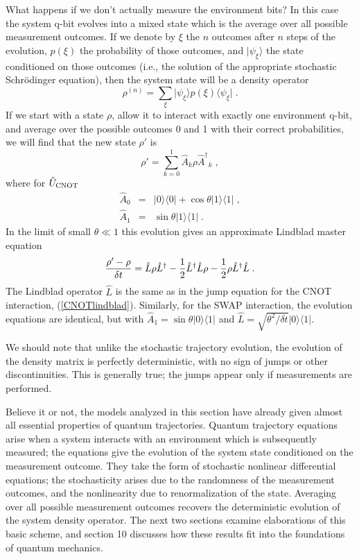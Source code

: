 \documentclass[12pt]{article}
\def\bra#1{{\langle #1 |}}
\def\ket#1{{| #1 \rangle}}
\def\U{{\hat U}}
\def\A{{\hat A}}
\def\Adag{{\hat A^\dagger}}
\def\L{{\hat L}}
\def\Ldag{{\hat L^\dagger}}
\begin{document}
What happens if we don't actually measure the environment bits?  In this
case the system q-bit evolves into a mixed state which is the average over
all possible measurement outcomes.  If we denote by $\xi$ the $n$ outcomes
after $n$ steps of the evolution, $p(\xi)$ the probability of those outcomes,
and $\ket{\psi_\xi}$ the state conditioned on those outcomes (i.e., the
solution of the appropriate stochastic Schr\"odinger equation), then the
system state will be a density operator
\begin{equation}
\rho^{(n)} = \sum_\xi \ket{\psi_\xi} p(\xi) \bra{\psi_\xi} \;.
\end{equation}
If we start with a state $\rho$, allow it to interact with exactly
one environment q-bit, and average over the possible outcomes
0 and 1 with their correct probabilities, we will find that the new state
$\rho'$ is
\begin{equation}
\rho' = \sum_{k=0}^1 \A_k \rho \Adag_k \;,
\label{rhoprime}
\end{equation}
where for $\U_{\rm CNOT}$
\begin{eqnarray}
\A_0 &=& \ket0\bra0 + \cos\theta \ket1\bra1 \;, \nonumber\\
\A_1 &=& \sin\theta \ket1\bra1 \;.
\label{ucnot1}
\end{eqnarray}
In the limit of small $\theta\ll1$ this evolution gives an approximate
Lindblad master equation
\begin{equation}
{{\rho' - \rho}\over\delta t} =
  \L \rho \Ldag - {1\over2} \Ldag\L \rho
  - {1\over2} \rho \Ldag\L \;.
\label{mean_lindblad}
\end{equation}
The Lindblad operator $\L$ is the same as in the jump equation for
the CNOT interaction, (\ref{CNOTlindblad}).  Similarly, for
the SWAP interaction, the evolution equations are
identical, but with $\A_1 = \sin\theta \ket0\bra1$ and
$\L = \sqrt{\theta^2/\delta t}\ket0\bra1$.

We should note that unlike the stochastic trajectory evolution, the
evolution of the density matrix is perfectly deterministic, with no sign
of jumps or other discontinuities.  This is generally true; the jumps
appear only if measurements are performed.

Believe it or not, the models analyzed in this section have
already given almost all essential properties of quantum trajectories.
Quantum trajectory equations arise when a system interacts with an
environment which is subsequently measured; the equations give the
evolution of the system state conditioned on the measurement outcome.
They take the form of stochastic nonlinear differential equations; the
stochasticity arises due to the randomness of the measurement outcomes,
and the nonlinearity due to renormalization of the state.  Averaging
over all possible measurement outcomes recovers the deterministic
evolution of the system density operator.  The next two sections examine
elaborations of this basic scheme, and section 10 discusses how
these results fit into the foundations of quantum mechanics.
\end{document}
